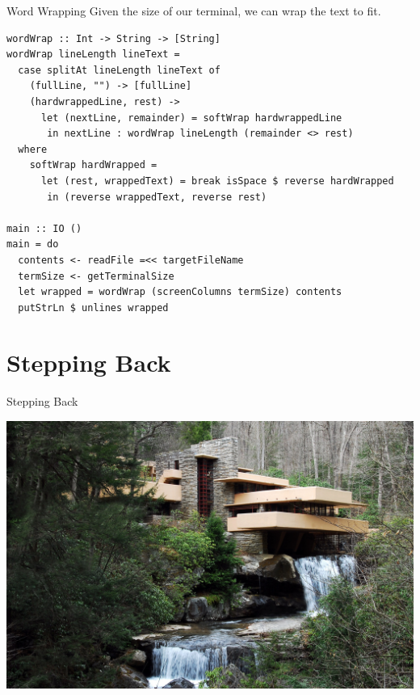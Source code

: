 \documentclass[10pt, presentation, colorlinks]{beamer}
\begin{document}
\begin{frame}[label={sec:orgfb181e1},fragile]{Word Wrapping}
 Given the size of our terminal, we can wrap the text to fit.

\pause
\bigskip

\begin{verbatim}
wordWrap :: Int -> String -> [String]
wordWrap lineLength lineText =
  case splitAt lineLength lineText of
    (fullLine, "") -> [fullLine]
    (hardwrappedLine, rest) ->
      let (nextLine, remainder) = softWrap hardwrappedLine
       in nextLine : wordWrap lineLength (remainder <> rest)
  where
    softWrap hardWrapped =
      let (rest, wrappedText) = break isSpace $ reverse hardWrapped
       in (reverse wrappedText, reverse rest)

main :: IO ()
main = do
  contents <- readFile =<< targetFileName
  termSize <- getTerminalSize
  let wrapped = wordWrap (screenColumns termSize) contents
  putStrLn $ unlines wrapped
\end{verbatim}
\end{frame}

\section{Stepping Back}
\label{sec:orgddb9608}

\begin{frame}[label={sec:orga119089}]{Stepping Back}
\begin{center}
\includegraphics[height=0.6\textheight]{./img/architecture.jpg}
\end{center}
\end{frame}
\end{document}
